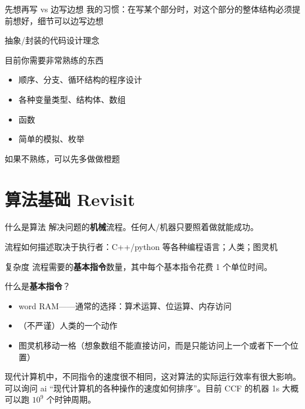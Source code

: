 \documentclass[11pt,aspectratio=169]{beamer}
\begin{document}
\begin{frame}{先想再写 vs 边写边想}
    我的习惯：在写某个部分时，对这个部分的整体结构必须提前想好，细节可以边写边想

    抽象/封装的代码设计理念
\end{frame}

\begin{frame}{目前你需要非常熟练的东西}
    \begin{itemize}
        \item 顺序、分支、循环结构的程序设计
        \item 各种变量类型、结构体、数组
        \item 函数
        \item 简单的模拟、枚举
    \end{itemize}

    如果不熟练，可以先多做做橙题
\end{frame}

\section{算法基础 Revisit}

\begin{frame}{什么是算法}
    解决问题的\textbf{机械}流程。任何人/机器只要照着做就能成功。

    流程如何描述取决于执行者：C++/python 等各种编程语言；人类；图灵机
\end{frame}

\begin{frame}{复杂度}
    流程需要的\textbf{基本指令}数量，其中每个基本指令花费 1 个单位时间。

    什么是\textbf{基本指令}？
    \begin{itemize}
        \item word RAM——通常的选择：算术运算、位运算、内存访问
        \item （不严谨）人类的一个动作
        \item 图灵机移动一格（想象数组不能直接访问，而是只能访问上一个或者下一个位置）
    \end{itemize}

    现代计算机中，不同指令的速度很不相同，这对算法的实际运行效率有很大影响。可以询问 ai “现代计算机的各种操作的速度如何排序”。目前 CCF 的机器 1s 大概可以跑 $10^9$ 个时钟周期。
\end{frame}
\end{document}
